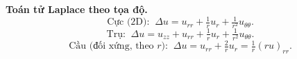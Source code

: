 \textbf{Toán tử Laplace theo tọa độ.}
$$\text{Cực (2D): }\ \Delta u=u_{rr}+\tfrac1r u_r+\tfrac{1}{r^2}u_{\theta\theta}.$$
$$\text{Trụ: }\ \Delta u=u_{zz}+u_{rr}+\tfrac1r u_r+\tfrac{1}{r^2}u_{\theta\theta}.$$
$$\text{Cầu (đối xứng, theo }r\text{): }\ \Delta u=u_{rr}+\tfrac2r u_r=\tfrac1r (r u)_{rr}.$$
